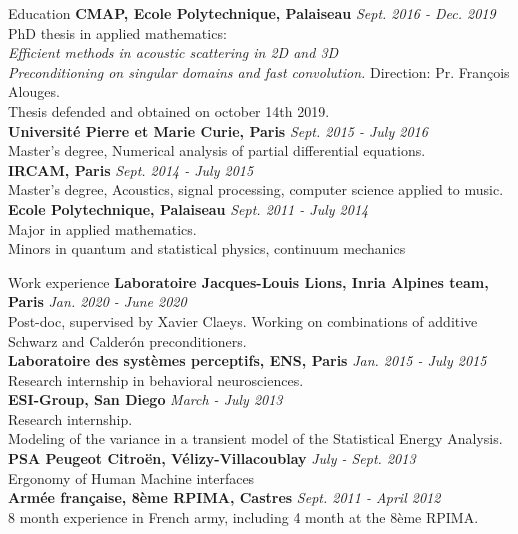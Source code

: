 \documentclass{resume} %
\begin{document}

\begin{rSection}{Education}
{\bf CMAP, Ecole Polytechnique, Palaiseau} \hfill {\em Sept. 2016 - Dec. 2019} 
\\ PhD thesis in applied mathematics:\\
{\em Efficient methods in acoustic scattering in 2D and 3D\\
Preconditioning on singular domains and fast convolution.} \hfill Direction: Pr. François Alouges. \\
Thesis defended and obtained on october 14th 2019.\\ 
{\bf Université Pierre et Marie Curie, Paris} \hfill {\em Sept. 2015 - July 2016} 
\\ Master's degree, Numerical analysis of partial differential equations.\\
{\bf IRCAM, Paris} \hfill {\em Sept. 2014 - July 2015} 
\\ Master's degree, Acoustics, signal processing, computer science applied to music. \\
{\bf Ecole Polytechnique, Palaiseau} \hfill {\em Sept. 2011 - July 2014}\\
Major in applied mathematics. \\
Minors in quantum and statistical physics, continuum mechanics



\end{rSection}

\begin{rSection}{Work experience}
{\bf Laboratoire Jacques-Louis Lions, Inria Alpines team, Paris} \hfill {\em Jan. 2020 - June 2020} \\
Post-doc, supervised by Xavier Claeys. Working on combinations of additive Schwarz and Calder\'{o}n preconditioners.\\
{\bf Laboratoire des systèmes perceptifs, ENS, Paris} \hfill {\em Jan. 2015 - July 2015} 
\\ Research internship in behavioral neurosciences.\\ 
{\bf ESI-Group, San Diego}
\hfill {\em March - July 2013} \\
Research internship. \\Modeling of the variance in a transient model of the Statistical Energy Analysis. \\
{\bf PSA Peugeot Citroën, Vélizy-Villacoublay} \hfill{\em July - Sept. 2013} \\
Ergonomy of Human Machine interfaces \\
{\bf Armée française, 8ème RPIMA, Castres}  \hfill{\em Sept. 2011 - April 2012}\\
8 month experience in French army, including 4 month at the 8ème RPIMA. 
\end{rSection}
\end{document}
